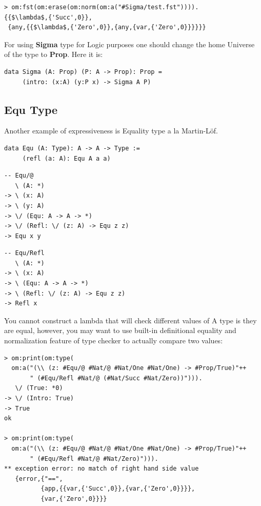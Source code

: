 \documentclass{aip-cp}
\begin{document}
\begin{lstlisting}[mathescape=true]
> om:fst(om:erase(om:norm(om:a("#Sigma/test.fst")))).
{{$\lambda$,{'Succ',0}},
 {any,{{$\lambda$,{'Zero',0}},{any,{var,{'Zero',0}}}}}}
\end{lstlisting}

For using {\bf Sigma} type for Logic purposes one should change the
home Universe of the type to {\bf Prop}. Here it is:

\begin{lstlisting}[mathescape=true]
data Sigma (A: Prop) (P: A -> Prop): Prop =
     (intro: (x:A) (y:P x) -> Sigma A P)
\end{lstlisting}

\subsection{Equ Type}
Another example of expressiveness is Equality type a la Martin-Löf.

\begin{lstlisting}
data Equ (A: Type): A -> A -> Type :=
     (refl (a: A): Equ A a a)
\end{lstlisting}

\begin{lstlisting}
-- Equ/@
   \ (A: *)
-> \ (x: A)
-> \ (y: A)
-> \/ (Equ: A -> A -> *)
-> \/ (Refl: \/ (z: A) -> Equ z z)
-> Equ x y
\end{lstlisting}

\begin{lstlisting}
-- Equ/Refl
   \ (A: *)
-> \ (x: A)
-> \ (Equ: A -> A -> *)
-> \ (Refl: \/ (z: A) -> Equ z z)
-> Refl x
\end{lstlisting}

You cannot construct a lambda that will check different values of A type is they are equal,
however, you may want to use built-in definitional equality and
normalization feature of type checker to actually compare two values:

\begin{lstlisting}[mathescape=true]
> om:print(om:type(
  om:a("(\\ (z: #Equ/@ #Nat/@ #Nat/One #Nat/One) -> #Prop/True)"++
       " (#Equ/Refl #Nat/@ (#Nat/Succ #Nat/Zero))"))).
   \/ (True: *0)
-> \/ (Intro: True)
-> True
ok

> om:print(om:type(
  om:a("(\\ (z: #Equ/@ #Nat/@ #Nat/One #Nat/One) -> #Prop/True)"++
       " (#Equ/Refl #Nat/@ #Nat/Zero)"))).
** exception error: no match of right hand side value
   {error,{"==",
          {app,{{var,{'Succ',0}},{var,{'Zero',0}}}},
          {var,{'Zero',0}}}}
\end{lstlisting}
\end{document}
